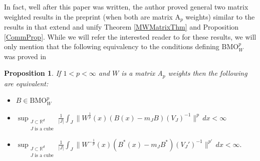 \documentclass[12pt,reqno ]{amsart}
\numberwithin{equation}{section}
\newtheorem{proposition}[theorem]{Proposition}
\theoremstyle{definition}
\newcommand{\R}{\ensuremath{\mathbb{R}}}
\newcommand{\BMOW}{\ensuremath{{\text{BMO}}_W ^p}}
\begin{document}
In fact, well after this paper was written, the author proved general two matrix weighted results in the preprint \cite{I1} (when both are matrix A${}_p$ weights) similar to the results in \cite{HLW} that extend and unify Theorem \ref{MWMatrixThm} and Proposition \ref{CommProp}.  While we will refer the interested reader to \cite{I1} for these results, we will only mention that the following equivalency to the conditions defining $\BMOW$ was proved in \cite{I1} \begin{proposition} \label{IsralProp} If $1 < p < \infty$ and $ W$  is a matrix A${}_p$ weights  then the following are equivalent:

\begin{itemize}{}{}

\item [(a')] $B \in \BMOW$ \\
\item[(b')]$\displaystyle \sup_{\substack{J \subset \R^d \\  J \text{ is a cube}}} \frac{1}{|J|} \int_J \|W^\frac{1}{p} (x) (B(x) - m_J B) (V_J) ^{-1}  \|^p \, dx < \infty $
\item[(c')] $\displaystyle \sup_{\substack{J \subset \R^d \\  J \text{ is a cube}}}  \frac{1}{|J|} \int_J \|W^{-\frac{1}{p}} (x) (B^* (x) - m_J B^*) (V_J ' )^{-1}  \|^{p'} \, dx < \infty.   $ \\

\end{itemize}
\end{proposition}
\end{document}

